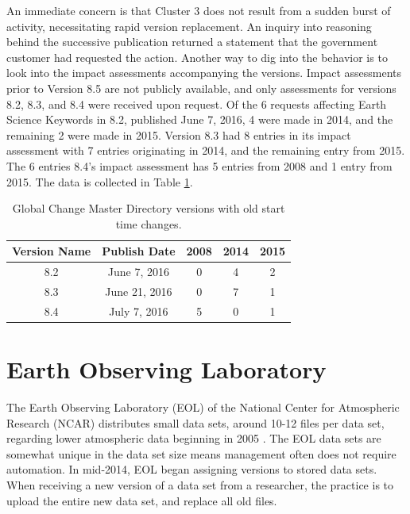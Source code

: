 An immediate concern is that Cluster 3 does not result from a sudden burst of activity, necessitating rapid version replacement.
An inquiry into reasoning behind the successive publication returned a statement that the government customer had requested the action.
Another way to dig into the behavior is to look into the impact assessments accompanying the versions.
Impact assessments prior to Version 8.5 are not publicly available, and only assessments for versions 8.2, 8.3, and 8.4 were received upon request.
Of the 6 requests affecting Earth Science Keywords in 8.2, published June 7, 2016, 4 were made in 2014, and the remaining 2 were made in 2015.
Version 8.3 had 8 entries in its impact assessment with 7 entries originating in 2014, and the remaining entry from 2015.
The 6 entries 8.4’s impact assessment has 5 entries from 2008 and 1 entry from 2015.
The data is collected in Table \ref{table:GCMD_old}.
\begin{table}
	\caption{Global Change Master Directory versions with old start time changes.}
	\label{table:GCMD_old}
	\centering
	\begin{tabular}{|c|c|c|c|c|}
		\hline
		Version Name&	Publish Date&	2008&	2014&	2015\\ \hline
		8.2&	June 7, 2016&	0&	4&	2\\
		8.3&	June 21, 2016&	0&	7&	1\\
		8.4&	July 7, 2016&	5&	0&	1\\
		\hline
	\end{tabular}
\end{table}


\section{Earth Observing Laboratory}

The Earth Observing Laboratory (EOL) of the National Center for Atmospheric Research (NCAR) distributes small data sets, around 10-12 files per data set, regarding lower atmospheric data beginning in 2005 \cite{EOL}.
The EOL data sets are somewhat unique in the data set size means management often does not require automation.
In mid-2014, EOL began assigning versions to stored data sets.
When receiving a new version of a data set from a researcher, the practice is to upload the entire new data set, and replace all old files.

